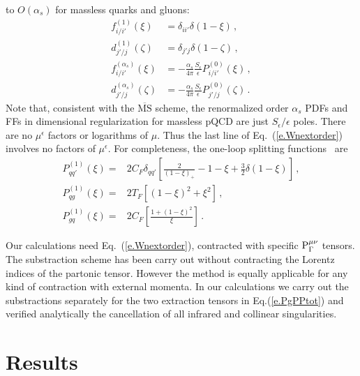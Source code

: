 \documentclass[prd,preprintnumbers,nofootinbib,superscriptaddress,onecolumn,preprint]{revtex4-1}
\newcommand\3[1]{\boldsymbol{#1}}
\newcommand{\parz}[1]{\ensuremath{\left(#1\right)}}
\newcommand{\order}[1]{\ensuremath{O\parz{#1}}}
\newcommand{\contractortot}[1]{\ensuremath{{\rm P}}_{#1}}
\newcommand{\eref}[1]{Eq.~(\ref{e.#1})}
\begin{document}
to $\order{\alpha_s}$ for massless quarks and gluons:
%
\begin{align}
f^{(1)}_{i/i'}(\xi)&{}=\delta_{ii'}\delta(1-\xi) \, ,  \\
d^{(1)}_{j'/j}(\zeta)&{}=\delta_{j'j}\delta(1-\zeta) \, , \\
f^{(\alpha_s)}_{i/i'}(\xi)&{}=-\frac{\alpha_s}{4\pi} 
\frac{S_\epsilon}{\epsilon} P^{(0)}_{i/i'}(\xi) \, , \\
d^{(\alpha_s)}_{j'/j}(\zeta)&{}=-\frac{\alpha_s}{4\pi} 
\frac{S_\epsilon}{\epsilon} P^{(0)}_{j'/j}(\zeta) \, .
\end{align}
%
Note that, consistent with the $\overline{\text{MS}}$ scheme, the
renormalized order $\alpha_s$ PDFs and FFs in dimensional
regularization for massless pQCD are just $S_\epsilon/\epsilon$ poles.
There are no $\mu^{\epsilon}$ factors or logarithms of $\mu$. Thus the
last line of \eref{Wnextorder} involves no factors of
$\mu^{\epsilon}$.  For completeness, the one-loop 
splitting functions~\cite{Altarelli:1977zs} are
%
\begin{align}
P^{(1)}_{qq'}(\xi)={}& 2C_F \delta_{qq'}
\left[ \frac{2}{(1-\xi)_{+}} 
-1 
-\xi +\frac{3}{2}\delta(1-\xi)
\right] \, , \\ 
P^{(1)}_{qg}(\xi)={}& 2 T_F \left[ (1 - \xi)^2 + \xi^2  \right] \, , \\
P^{(1)}_{gq}(\xi)={}& 2 C_F \left[ \frac{1 + (1 - \xi)^2}{\xi} \right] \, .
\end{align}

Our calculations need \eref{Wnextorder}, contracted with specific
$\contractortot{\Gamma}^{\mu\nu}$ tensors. The
substraction scheme has been carry out without contracting the Lorentz
indices of the partonic tensor. However the method is equally
applicable for any kind of contraction with external momenta. In our
calculations we carry out the substractions separately for the two 
extraction tensors in Eq.(\ref{e.PgPPtot}) and verified analytically
the cancellation of all infrared and collinear singularities.


\section{Results}
\label{s.results}

\end{document}
